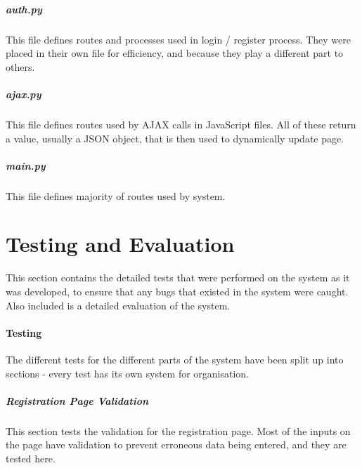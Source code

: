 \documentclass{article}[12pt,a4paper]
\begin{document}
\subsubsection{auth.py}
This file defines routes and processes used in login / register process. They were placed in their own file for efficiency, and because they play a different part to others.


\subsubsection{ajax.py}
This file defines routes used by AJAX calls in JavaScript files. All of these return a value, usually a JSON object, that is then used to dynamically update page.


\subsubsection{main.py}
This file defines majority of routes used by system.


\cleardoublepage


\part{Testing and Evaluation}
This section contains the detailed tests that were performed on the system as it was developed, to ensure that any bugs that existed in the system were caught. Also included is a detailed evaluation of the system.

\subsection{Testing}
The different tests for the different parts of the system have been split up into sections - every test has its own system for organisation.

\subsubsection{Registration Page Validation}
This section tests the validation for the registration page. Most of the inputs on the page have validation to prevent erroneous data being entered, and they are tested here.
\end{document}
